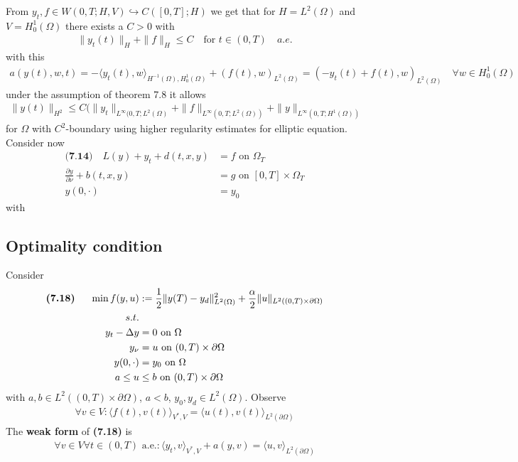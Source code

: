 From $y_t, f \in W(0, T; H, V) \hookrightarrow C([0, T]; H)$ we get that for $H = L^2(\Omega)$ and $V = H_0^1(\Omega)$ there exists a $C > 0$ with
\begin{align*}
	\|y_t(t)\|_H + \|f\|_H \le C \quad \text{for } t \in (0, T) \quad a.e.
\end{align*}
with this
\begin{align*}
	a(y(t), w, t) = - \langle y_t(t), w \rangle_{H^{-1}(\Omega), H^1_0(\Omega)} + (f(t), w)_{L^2(\Omega)} = (-y_t(t) + f(t), w )_{L^2(\Omega)} \quad\forall w \in H^1_0(\Omega)
\end{align*}
under the assumption of theorem 7.8 it allows
\begin{align*}
	\|y(t)\|_{H^2} \le C (\|y_t\|_{L^\infty(0, T; L^2(\Omega)} + \|f\|_{L^\infty(0, T; L^2(\Omega))} + \|y\|_{L^\infty(0, T; H^1(\Omega))}
\end{align*}
for $\Omega$ with $C^2$-boundary using higher regularity estimates for elliptic equation. \\
Consider now
\begin{align*}
\textbf{(7.14)} \quad 
	L(y) + y_t + d(t, x, y) &= f \text{ on } \Omega_T\\
	\frac{\partial y}{\partial \nu} + b(t, x, y) &= g \text{ on } [0, T] \times \Omega_T\\
	y(0, \cdot) &= y_0
\end{align*}
with


\begin{theorem}
	
\end{theorem}



\subsection{Optimality condition}
Consider 
\begin{align*}
	\textbf{(7.18) \quad}
	\min f(y,u) &:= \frac{1}{2} \|y(T) - y_d\|_{L^2(\Omega)}^2 + \frac{\alpha}{2}\|u\|_{L^2((0, T) \times \partial\Omega)}\\
	s.t.\\
	y_t - \Delta y &= 0 \text{ on } \Omega\\
	y_\nu &= u \text{ on } (0, T) \times \partial \Omega\\
	y(0, \cdot) &= y_0 \text{ on } \Omega\\
	a \le u &\le b \text{ on } (0, T) \times \partial \Omega
\end{align*}
with $a, b \in L^2((0, T) \times \partial \Omega)$, $a < b$, $y_0, y_d \in L^2(\Omega)$. 
Observe
\begin{align*}
\forall v \in V:
	\langle f(t), v(t) \rangle_{V^*, V} = \langle u(t), v(t) \rangle_{L^2(\partial\Omega)}
\end{align*}
The \textbf{weak form} of \textbf{(7.18)} is 
\begin{align*}
	\forall v \in V \forall t \in (0, T) \text{ a.e.}: 
	\langle y_t, v \rangle_{V^*, V} + a(y, v) = \langle u, v\rangle_{L^2(\partial\Omega)}
\end{align*}


